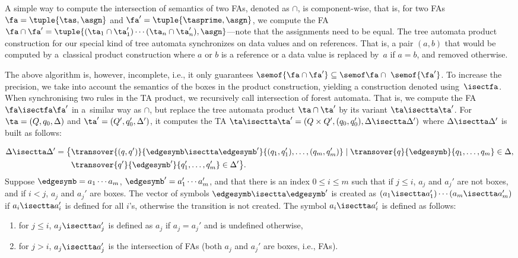 {A simple way to compute 
%
%
%
the intersection of semantics of two FAs, denoted as $\cap$, is com\-po\-nent-wise, 
that is, for two FAs $\fa = \tuple{\tas,\asgn}$ and $\fa' = \tuple{\tasprime,\asgn}$,
we compute the FA $\fa\cap\fa' =
\tuple{(\ta_1\cap\ta_1')\cdots(\ta_n\cap\ta_n'), \asgn}$---note that the assignments need to be equal.
%
The tree automata product construction for our special kind of tree automata
synchronizes on data values and on references.
That is, a pair $(a,b)$ that would be computed by a~classical product
construction where $a$ or $b$ is a reference or a data value is replaced by~$a$
if $a = b$, and removed otherwise.

The above algorithm is, however, incomplete, i.e., it only guarantees $\semof{\fa\cap\fa'}\subseteq\semof\fa\cap~\semof{\fa'}$.
%
To increase the precision, we take into account the semantics of the boxes in
the product construction, yielding a construction denoted using~$\isectfa$.
When synchronising two rules in the TA product, we recursively call intersection of forest automata.
%
That is, we compute the FA $\fa\isectfa\fa'$ in a~similar way as $\cap$, but replace the tree
automata product $\ta\cap\ta'$ by its variant $\ta\isectta\ta'$.
For $\ta = (Q, q_0, \Delta)$ and $\ta' = (Q',q_0', \Delta')$, it computes the  TA
$\ta\isectta\ta' = (Q \times Q', (q_0, q_0'), \Delta\isectta\Delta')$ where
$\Delta\isectta\Delta'$ is built as follows:

\eject

    \begin{align*}
    \Delta\isectta\Delta' = \big\{ & \transover{(q, q')}{\edgesymb\isectta\edgesymb'}{(q_1, q'_1), \ldots,
      (q_m, q'_m)} \mid \transover{q}{\edgesymb}{q_1, \ldots, q_m}
      \in \Delta,\\
      &
      \transover{q'}{\edgesymb'}{q'_1, \ldots, q'_m} \in \Delta'
      \big\}.\vspace*{-1mm}
    \end{align*}
    Suppose $\edgesymb = a_1 \cdots a_m$, $\edgesymb' = a_1' \cdots
    a_m'$, and that there is an index $0 \leq i \leq m$ such that if $
    j \leq i$, $a_j$ and $a_j'$ are not boxes, and if $i < j
    $, $a_j$ and $a_j'$ are boxes.
    The vector of symbols $\edgesymb \isectta \edgesymb'$ is created as
    $(a_1\isectta a_1') \cdots (a_m\isectta a_m')$ if $a_i\isectta a_i'$ is
    defined for all $i$'s, otherwise the transition is not created.
    The symbol $a_i\isectta a_i'$ is defined as follows:
    \begin{enumerate}
      \item  for $j \leq i$, $a_j\isectta a_j'$ is defined as $a_j$ if $a_j = a_j'$ and is undefined otherwise,
      \item  for $j > i$, $a_j\isectta a_j'$ is the intersection of FAs (both
        $a_j$ and $a_j'$ are boxes, i.e., FAs).
    \end{enumerate}


}
